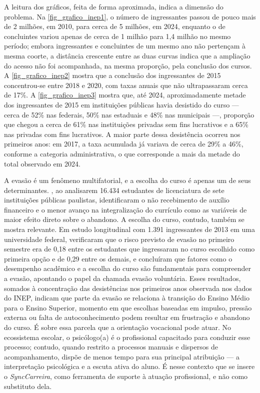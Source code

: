 A leitura dos gráficos, feita de forma aproximada, indica a dimensão do problema. Na \autoref{fig_grafico_inep1}, o número de ingressantes passou de pouco mais de 2 milhões, em 2010, para cerca de 5 milhões, em 2024, enquanto o de concluintes variou apenas de cerca de 1 milhão para 1,4 milhão no mesmo período; embora ingressantes e concluintes de um mesmo ano não pertençam à mesma coorte, a distância crescente entre as duas curvas indica que a ampliação do acesso não foi acompanhada, na mesma proporção, pela conclusão dos cursos. A \autoref{fig_grafico_inep2} mostra que a conclusão dos ingressantes de 2015 concentrou-se entre 2018 e 2020, com taxas anuais que não ultrapassaram cerca de 17\%. A \autoref{fig_grafico_inep3} mostra que, até 2024, aproximadamente metade dos ingressantes de 2015 em instituições públicas havia desistido do curso --- cerca de 52\% nas federais, 50\% nas estaduais e 48\% nas municipais ---, proporção que chegou a cerca de 61\% nas instituições privadas sem fins lucrativos e a 65\% nas privadas com fins lucrativos. A maior parte dessa desistência ocorreu nos primeiros anos: em 2017, a taxa acumulada já variava de cerca de 29\% a 46\%, conforme a categoria administrativa, o que corresponde a mais da metade do total observado em 2024.

A evasão é um fenômeno multifatorial, e a escolha do curso é apenas um de seus determinantes. , ao analisarem 16.434 estudantes de licenciatura de sete instituições públicas paulistas, identificaram o não recebimento de auxílio financeiro e o menor avanço na integralização do currículo como as variáveis de maior efeito direto sobre o abandono. A escolha do curso, contudo, também se mostra relevante. Em estudo longitudinal com 1.391 ingressantes de 2013 em uma universidade federal,  verificaram que o risco previsto de evasão no primeiro semestre era de 0,18 entre os estudantes que ingressaram no curso escolhido como primeira opção e de 0,29 entre os demais, e concluíram que fatores como o desempenho acadêmico e a escolha do curso são fundamentais para compreender a evasão, apontando o papel da chamada evasão voluntária. Esses resultados, somados à concentração das desistências nos primeiros anos observada nos dados do INEP, indicam que parte da evasão se relaciona à transição do Ensino Médio para o Ensino Superior, momento em que escolhas baseadas em impulso, pressão externa ou falta de autoconhecimento podem resultar em frustração e abandono do curso. É sobre essa parcela que a orientação vocacional pode atuar. No ecossistema escolar, o psicólogo(a) é o profissional capacitado para conduzir esse processo; contudo, quando restrito a processos manuais e dispersos de acompanhamento, dispõe de menos tempo para sua principal atribuição --- a interpretação psicológica e a escuta ativa do aluno. É nesse contexto que se insere o \textit{SyncCarreira}, como ferramenta de suporte à atuação profissional, e não como substituto dela.

